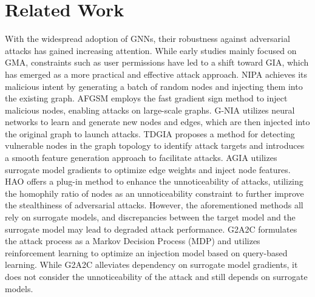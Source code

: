 \section{Related Work}
With the widespread adoption of GNNs, their robustness against adversarial attacks has gained increasing attention. While early studies mainly focused on GMA, constraints such as user permissions have led to a shift toward GIA, which has emerged as a more practical and effective attack approach. NIPA \cite{Sun2020Adversarial} achieves its malicious intent by generating a batch of random nodes and injecting them into the existing graph. AFGSM \cite{wang2020scalable} employs the fast gradient sign method to inject malicious nodes, enabling attacks on large-scale graphs. G-NIA \cite{tao2021single} utilizes neural networks to learn and generate new nodes and edges, which are then injected into the original graph to launch attacks. TDGIA \cite{zou2021tdgia} proposes a method for detecting vulnerable nodes in the graph topology to identify attack targets and introduces a smooth feature generation approach to facilitate attacks. AGIA \cite{chen2022understanding} utilizes surrogate model gradients to optimize edge weights and inject node features. HAO \cite{chen2022understanding} offers a plug-in method to enhance the unnoticeability of attacks, utilizing the homophily ratio of nodes as an unnoticeability constraint to further improve the stealthiness of adversarial attacks. However, the aforementioned methods all rely on surrogate models, and discrepancies between the target model and the surrogate model may lead to degraded attack performance. G2A2C \cite{ju2023let} formulates the attack process as a Markov Decision Process (MDP) and utilizes reinforcement learning to optimize an injection model based on query-based learning. While G2A2C alleviates dependency on surrogate model gradients, it does not consider the unnoticeability of the attack and still depends on surrogate models.